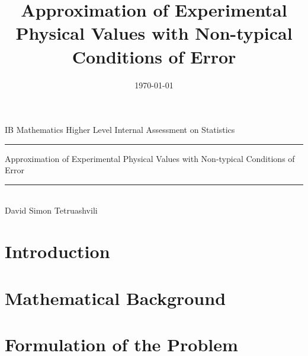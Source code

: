 \documentclass[11pt]{article}
\title{Approximation of Experimental Physical Values with Non-typical Conditions of Error}
\date{\today}
\numberwithin{equation}{subsection}
\begin{document}
\begin{titlepage}
\begin{center}
IB Mathematics Higher Level Internal Assessment on Statistics 
\\ 
\rule{\textwidth}{0.25pt}
\linebreak
\Huge{Approximation of Experimental Physical Values with Non-typical Conditions of Error}
\rule{\textwidth}{0.25pt} \\
[15cm]
\large {David Simon Tetruashvili} \\

\end{center}
\end{titlepage}
\newpage

\tableofcontents
{}
\newpage

\section{Introduction}

\section{Mathematical Background}

\section{Formulation of the Problem}
\end{document}
